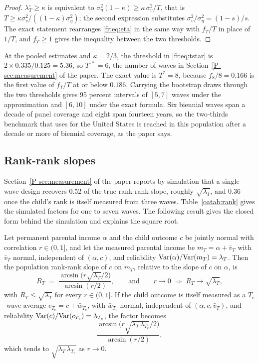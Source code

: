 \begin{proof}
$\lambda^{\circ}_T \ge \kappa$ is equivalent to
$\sigma^2_\eta(1-\kappa) \ge \kappa\,\sigma^2_v/T$, that is
$T \ge \kappa\sigma^2_v/((1-\kappa)\sigma^2_\eta)$; the second expression
substitutes $\sigma^2_v/\sigma^2_\eta = (1-s)/s$. The exact statement
rearranges \eqref{fr:eq:eta} in the same way with $f_T/T$ in place of
$1/T$, and $f_T \ge 1$ gives the inequality between the two thresholds.
\end{proof}

At the pooled estimates and $\kappa = 2/3$, the threshold in
\eqref{fr:eq:tstar} is $2 \times 0.335/0.125 = 5.36$, so
$T^{\circ *} = 6$, the number of waves in Section~\ref{P-sec:measurement}
of the paper. The exact value is $T^* = 8$, because $f_8/8 = 0.166$ is the
first value of $f_T/T$ at or below $0.186$. Carrying the bootstrap draws
through the two thresholds gives 95 percent intervals of $[5, 7]$ waves
under the approximation and $[6, 10]$ under the exact formula. Six biennial waves span a decade of panel coverage and eight span fourteen years, so the two-thirds benchmark that \citet{Mazumder2005} uses for the United States is reached in this population after a decade or more of biennial coverage, as the paper says.

\subsection{Rank-rank slopes}

Section~\ref{P-sec:measurement} of the paper reports by simulation that a
single-wave design recovers 0.52 of the true rank-rank slope, roughly
$\sqrt{\lambda_1}$, and 0.36 once the child's rank is itself measured from
three waves. Table~\ref{oatab:rank} gives the simulated
factors for one to seven waves. The following result gives the closed
form behind the simulation and explains the square root.

\begin{proposition}
\label{fr:prop:rank}
Let permanent parental income $\alpha$ and the child outcome $c$ be
jointly normal with correlation $r \in (0,1]$, and let the measured
parental income be $m_T = \alpha + \bar v_T$ with $\bar v_T$ normal,
independent of $(\alpha, c)$, and reliability
$\mathrm{Var}(\alpha)/\mathrm{Var}(m_T) = \lambda_T$. Then the population rank-rank slope of
$c$ on $m_T$, relative to the slope of $c$ on $\alpha$, is
\begin{equation}
R_T \;=\; \frac{\arcsin\!\big(r\sqrt{\lambda_T}/2\big)}{\arcsin(r/2)},
\qquad \text{and} \qquad r\to 0 \;\Rightarrow\; R_T \to \sqrt{\lambda_T},
\label{fr:eq:rank}
\end{equation}
with $R_T \le \sqrt{\lambda_T}$ for every $r \in (0,1]$. If the child outcome
is itself measured as a $T_c$-wave average $c_{T_c} = c + \bar w_{T_c}$,
with $\bar w_{T_c}$ normal, independent of $(\alpha, c, \bar v_T)$, and
reliability $\mathrm{Var}(c)/\mathrm{Var}(c_{T_c}) = \lambda_{T_c}$, the factor becomes
\[
\frac{\arcsin\!\big(r\sqrt{\lambda_T\,\lambda_{T_c}}/2\big)}{\arcsin(r/2)},
\]
which tends to $\sqrt{\lambda_T\,\lambda_{T_c}}$ as $r \to 0$.
\end{proposition}


